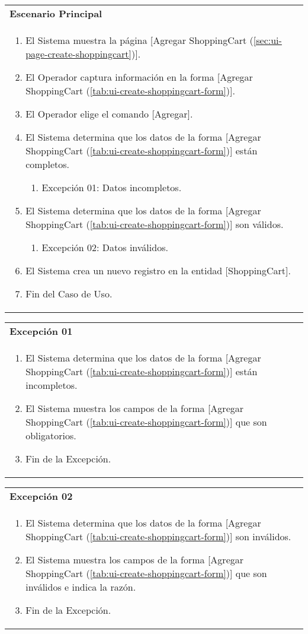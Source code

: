 	\begin{tabular}{ p{15.5cm} }
		\textbf{Escenario Principal} \\
		\begin{enumerate}
			\item El Sistema muestra la p\'agina [Agregar ShoppingCart (\ref{sec:ui-page-create-shoppingcart})].
			\item El Operador captura informaci\'on en la forma [Agregar ShoppingCart (\ref{tab:ui-create-shoppingcart-form})].
			\item El Operador elige el comando [Agregar].
			\item El Sistema determina que los datos de la forma [Agregar ShoppingCart (\ref{tab:ui-create-shoppingcart-form})] est\'an completos.
				\begin{enumerate}
					\item Excepci\'on 01: Datos incompletos.
				\end{enumerate}
			\item El Sistema determina que los datos de la forma [Agregar ShoppingCart (\ref{tab:ui-create-shoppingcart-form})] son v\'alidos.
				\begin{enumerate}
					\item Excepci\'on 02: Datos inv\'alidos.
				\end{enumerate}
			\item El Sistema crea un nuevo registro en la entidad [ShoppingCart].
			\item Fin del Caso de Uso.
		\end{enumerate}
	\end{tabular}
	
	\begin{tabular}{ p{15.5cm} }
		\textbf{Excepci\'on 01} \\
		\begin{enumerate}
			\item El Sistema determina que los datos de la forma [Agregar ShoppingCart (\ref{tab:ui-create-shoppingcart-form})] est\'an incompletos.
			\item El Sistema muestra los campos de la forma [Agregar ShoppingCart (\ref{tab:ui-create-shoppingcart-form})] que son obligatorios.
			\item Fin de la Excepci\'on.
		\end{enumerate}
	\end{tabular}
	
	\begin{tabular}{ p{15.5cm} }
		\textbf{Excepci\'on 02} \\
		\begin{enumerate}
			\item El Sistema determina que los datos de la forma [Agregar ShoppingCart (\ref{tab:ui-create-shoppingcart-form})] son inv\'alidos.
			\item El Sistema muestra los campos de la forma [Agregar ShoppingCart (\ref{tab:ui-create-shoppingcart-form})] que son inv\'alidos e indica la raz\'on.
			\item Fin de la Excepci\'on.
		\end{enumerate}
	\end{tabular}
	

